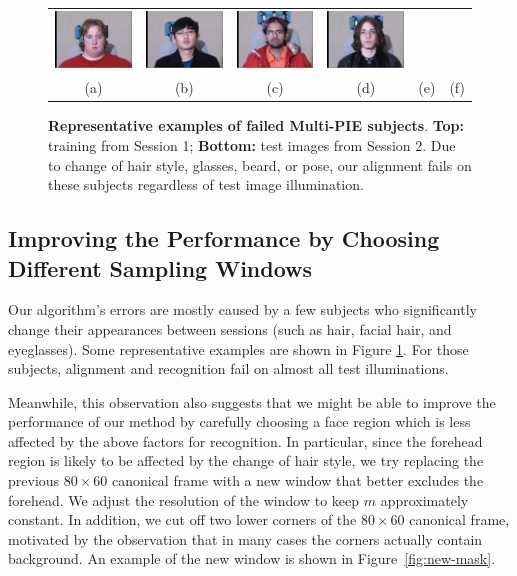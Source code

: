 \documentclass[12pt,journal,draftcls,letterpaper,onecolumn]{IEEEtran}
\begin{document}
\begin{figure}
\begin{tabular}{cccccc}
\includegraphics[width=0.9in,clip=true]{figures_pami/multipie_failed/196_02_01_051_08.png}  &
\includegraphics[width=0.9in,clip=true]{figures_pami/multipie_failed/130_02_01_051_08.png}  &
\includegraphics[width=0.9in,clip=true]{figures_pami/multipie_failed/163_02_01_051_08.png}  &
\includegraphics[width=0.9in,clip=true]{figures_pami/multipie_failed/175_02_01_051_08.png} \\
(a) & (b) & (c) & (d) & (e) & (f)
\end{tabular}
\caption{{\bf Representative examples of failed Multi-PIE subjects}. {\bf Top:} training from Session 1; {\bf Bottom:} test images from Session 2. Due to change of hair style, glasses, beard, or pose, our alignment fails on these subjects regardless of test image illumination.}
\label{fig:failed-examples}
\end{figure}

\subsection{Improving the Performance by Choosing Different Sampling Windows}
Our algorithm's errors are mostly caused by a few subjects who
significantly change their appearances between sessions (such
as hair, facial hair, and eyeglasses). Some representative
examples are shown in Figure \ref{fig:failed-examples}. For those subjects, alignment and recognition fail on
almost all test illuminations.

Meanwhile, this observation also suggests that we might be able
to improve the performance of our method by carefully choosing
a face region which is less affected by the above factors for
recognition. In particular, since the forehead region is likely
to be affected by the change of hair style, we try replacing
the previous $80 \times 60$ canonical frame with a new
window that better excludes the forehead. We adjust the
resolution of the window to keep $m$ approximately constant. In addition,
we cut off two lower corners of the $80 \times 60$ canonical frame, motivated by
the observation that in many cases the corners
actually contain background. An example of the new window
is shown in Figure~\ref{fig:new-mask}.
\end{document}
